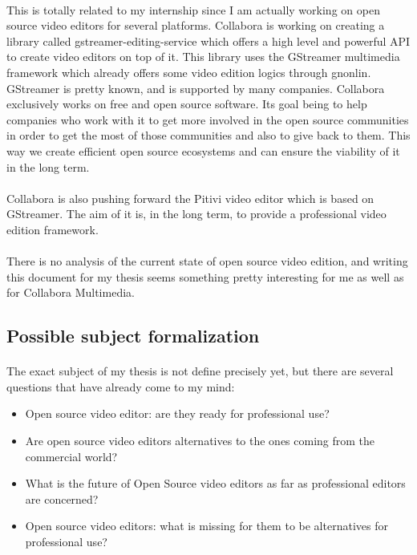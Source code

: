   \paragraph{}
    This is totally related to my internship since I am actually working on
    open source video editors for several platforms. Collabora is working
    on creating a library called gstreamer-editing-service which offers a
    high level and powerful API to create video editors on top of it. This
    library uses the GStreamer multimedia framework which already offers
    some video edition logics through gnonlin. GStreamer is pretty known,
    and is supported by many companies. Collabora exclusively works
    on free and open source software. Its goal being to help companies
    who work with it to get more involved in the open source communities in
    order to get the most of those communities and also to give back to them.
    This way we create efficient open source ecosystems and can ensure the viability
    of it in the long term.

  \paragraph{}
    Collabora is also pushing forward the Pitivi video editor which is
    based on GStreamer. The aim of it is, in the long term, to provide a
    professional video edition framework.

  \paragraph{}
    There is no analysis of the current state of open source video edition, and
    writing this document for my thesis seems something pretty interesting
    for me as well as for Collabora Multimedia.

\subsection{Possible subject formalization}
  \paragraph{}
    The exact subject of my thesis is not define precisely yet, but there are several
    questions that have already come to my mind:
    \begin{itemize}
      \item {Open source video editor: are they ready for professional use?}
      \item {Are open source video editors alternatives to the ones
             coming from the commercial world?}
      \item {What is the future of Open Source video editors as far as
             professional editors are concerned?}
      \item {Open source video editors: what is missing for them to be
             alternatives for professional use?}
    \end{itemize}

